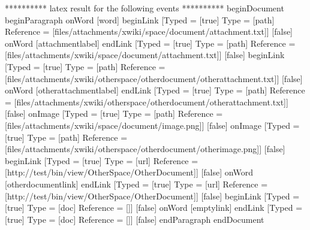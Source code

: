 ********** latex result for the following events **********
beginDocument
beginParagraph
onWord [word]
beginLink [Typed = [true] Type = [path] Reference = [files/attachments/xwiki/space/document/attachment.txt]] [false]
onWord [attachmentlabel]
endLink [Typed = [true] Type = [path] Reference = [files/attachments/xwiki/space/document/attachment.txt]] [false]
beginLink [Typed = [true] Type = [path] Reference = [files/attachments/xwiki/otherspace/otherdocument/otherattachment.txt]] [false]
onWord [otherattachmentlabel]
endLink [Typed = [true] Type = [path] Reference = [files/attachments/xwiki/otherspace/otherdocument/otherattachment.txt]] [false]
onImage [Typed = [true] Type = [path] Reference = [files/attachments/xwiki/space/document/image.png]] [false]
onImage [Typed = [true] Type = [path] Reference = [files/attachments/xwiki/otherspace/otherdocument/otherimage.png]] [false]
beginLink [Typed = [true] Type = [url] Reference = [http://test/bin/view/OtherSpace/OtherDocument]] [false]
onWord [otherdocumentlink]
endLink [Typed = [true] Type = [url] Reference = [http://test/bin/view/OtherSpace/OtherDocument]] [false]
beginLink [Typed = [true] Type = [doc] Reference = []] [false]
onWord [emptylink]
endLink [Typed = [true] Type = [doc] Reference = []] [false]
endParagraph
endDocument